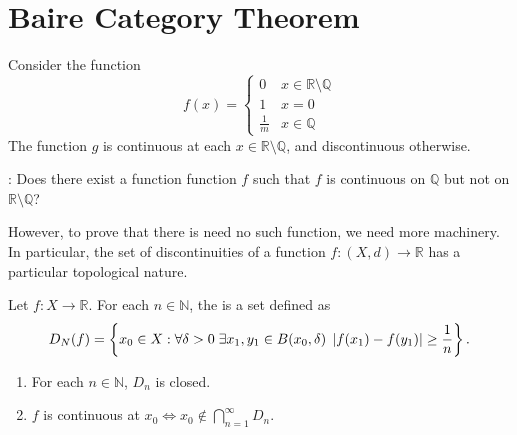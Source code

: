 \documentclass[notoc,notitlepage]{tufte-book}
\begin{document}

\section{Baire Category Theorem}%
\label{sec:baire_category_theorem}

\begin{eg}
  Consider the function
  \begin{equation*}
    f(x) = \begin{cases}
      0           & x \in \mathbb{R} \setminus \mathbb{Q}\\
      1           & x = 0 \\
      \frac{1}{m} & x \in \mathbb{Q}
    \end{cases}
  \end{equation*}
  The function $g$ is continuous at each $x \in \mathbb{R} \setminus \mathbb{Q}$, and discontinuous otherwise.
\end{eg}

: Does there exist a function function $f$ such that $f$ is continuous on $\mathbb{Q}$ but not on $\mathbb{R} \setminus \mathbb{Q}$? 

However, to prove that there is need no such function, we need more machinery. In particular, the set of discontinuities of a function $f : (X, d) \to \mathbb{R}$ has a particular topological nature.

\begin{defn}\label{defn:points_of_discontinuity}
  Let $f : X \to \mathbb{R}$. For each $n \in \mathbb{N}$, the  is a set defined as
  \begin{equation*}
    D_N(f) = \left\{ x_0 \in X : \forall \delta > 0 \; \exists x_1, y_1 \in B(x_0, \delta) \; \left| f(x_1) - f(y_1) \right| \geq \frac{1}{n} \right\}.
  \end{equation*}
\end{defn}

\begin{note}
  \begin{enumerate}
    \item For each $n \in \mathbb{N}$, $D_n$ is closed.
    \item $f$ is continuous at $x_0 \iff x_0 \notin \bigcap_{n = 1}^{\infty} D_n$.
  \end{enumerate}
\end{note}
\end{document}
